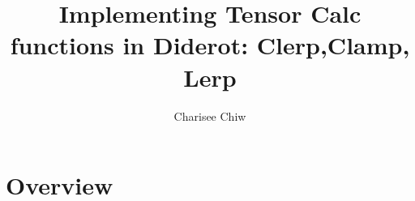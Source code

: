 \documentclass{article}
\title{Implementing Tensor Calc functions in Diderot: Clerp,Clamp, Lerp}
\author{Charisee Chiw}
\begin{document}
\maketitle 

\section{Overview}



 
\end{document}
